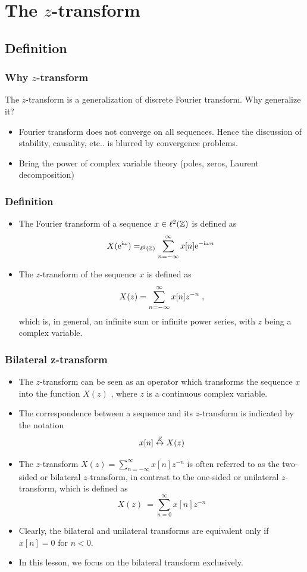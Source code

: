 \section{The $z$-transform}
\subsection{Definition}
\begin{frame}
\frametitle{Why $z$-transform}
The $z$-transform is a generalization of discrete Fourier transform. Why generalize it?
\begin{itemize}
\item Fourier transform does not converge on all sequences. Hence the discussion of stability, causality, etc.. is blurred by convergence problems.
\item Bring the power of complex variable theory (poles, zeros, Laurent decomposition)
\end{itemize}
\end{frame}

\begin{frame}
\frametitle{Definition}
\begin{itemize}
\item The Fourier transform of a sequence $x \in \ell^2(\mathbb{Z})$ is defined as
\[
X(\mathrm{e}^{\mathrm{i} \omega}) =_{\ell^2(\mathbb{Z})} \sum_{n=-\infty}^\infty x[n] \mathrm{e}^{-\mathrm{i} \omega n} \;
\]
\item The $z$-transform of the sequence $x$ is defined as
\[
X(z)= \sum_{n=-\infty}^{\infty} x[n] z^{-n} \;,
\]
which is, in general, an infinite sum or infinite power series, with $z$ being a complex variable.
\end{itemize}
\end{frame}



\begin{frame}
\frametitle{Bilateral z-transform}
\begin{itemize}
\item The $z$-transform can be seen as an operator which transforms the sequence $x$ into the function $X(z)$ , where $z$ is a continuous complex variable.
\item The correspondence between a sequence and its $z$-transform is indicated by the notation
$$
x[n] \stackrel{Z}{\leftrightarrow} X(z)
$$
\item The $z$-transform $X(z)= \sum_{n=-\infty}^\infty x[n] z^{-n}$ is often referred to as the \alert{two-sided} or \alert{bilateral} $z$-transform, in contrast to the \alert{one-sided} or \alert{unilateral} $z$-transform, which is defined as
$$
X(z)\ =\sum_{n=0}^{\infty}x[n]z^{-n}
$$
\item Clearly, the bilateral and unilateral transforms are equivalent only if $x[n]=0$ for $n<0$.
\item In this lesson, we focus on the bilateral transform exclusively.
\end{itemize}
\end{frame}


